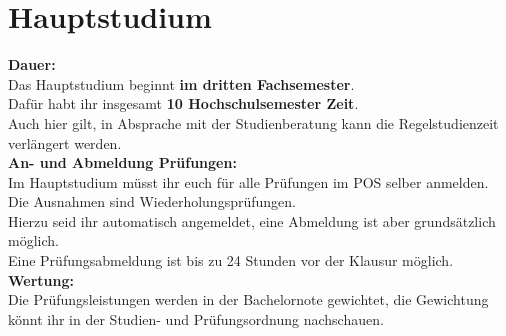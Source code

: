 \section{Hauptstudium}

\textbf{Dauer:}\\
Das Hauptstudium beginnt \textbf{im dritten Fachsemester}.\\
Dafür habt ihr insgesamt \textbf{10 Hochschulsemester Zeit}.\\
Auch hier gilt, in Absprache mit der Studienberatung kann die Regelstudienzeit verlängert werden.\\

\textbf{An- und Abmeldung Prüfungen:}\\
Im Hauptstudium müsst ihr euch für alle Prüfungen im POS selber anmelden.\\
Die Ausnahmen sind Wiederholungsprüfungen.\\
Hierzu seid ihr automatisch angemeldet, eine Abmeldung ist aber grundsätzlich möglich.\\ %
Eine Prüfungsabmeldung ist bis zu 24 Stunden vor der Klausur möglich.\\

\textbf{Wertung:}\\
Die Prüfungsleistungen werden in der Bachelornote gewichtet, die Gewichtung könnt ihr in der \glqq Studien- und Prüfungsordnung \grqq nachschauen.\\
